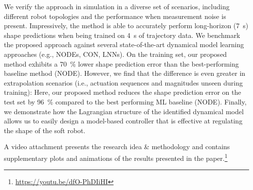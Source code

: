 We verify the approach in simulation in a diverse set of scenarios, including different robot topologies and the performance when measurement noise is present. Impressively, the method is able to accurately perform long-horizon (\SI{7}{s}) shape predictions when being trained on \SI{4}{s} of trajectory data.
We benchmark the proposed approach against several state-of-the-art dynamical model learning approaches (e.g., \glspl{NODE}, \gls{CON}, \glspl{LNN}). On the training set, our proposed method exhibits a \SI{70}{\percent} lower shape prediction error than the best-performing baseline method (\gls{NODE}).
However, we find that the difference is even greater in extrapolation scenarios (i.e., actuation sequences and magnitudes unseen during training): Here, our proposed method reduces the shape prediction error on the test set by \SI{96}{\percent} compared to the best performing \gls{ML} baseline (\gls{NODE}).
Finally, we demonstrate how the Lagrangian structure of the identified dynamical model allows us to easily design a model-based controller that is effective at regulating the shape of the soft robot.

A video attachment presents the research idea \& methodology and contains supplementary plots and animations of the results presented in the paper.\footnote{{\small \url{https://youtu.be/dfO-PhDIiHI}}}